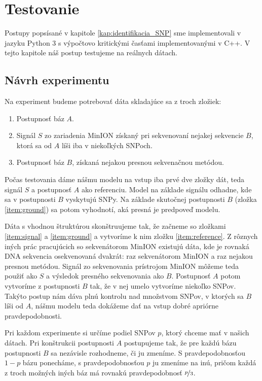 \chapter{Testovanie}

\label{kap:testovanie}

Postupy popsísané v kapitole \ref{kap:identifikacia_SNP} sme implementovali v jazyku Python 3 s
výpočtovo kritickými časťami implementovanými v C++.
V tejto kapitole náš postup testujeme na reálnych dátach.


\section{Návrh experimentu}

Na experiment budeme potrebovať dáta skladajúce sa z troch zložiek:

\begin{enumerate}
\item \label{item:reference} Postupnosť báz $A$.
\item \label{item:signal} Signál $S$ zo zariadenia MinION získaný pri sekvenovaní nejakej sekvencie $B$, 
ktorá sa od $A$ líši iba v niekoľkých SNPoch.
\item \label{item:ground} Postupnosť báz $B$, získaná nejakou presnou sekvenačnou metódou.
\end{enumerate}

Počas testovania dáme nášmu modelu na vstup iba prvé dve zložky dát, teda signál $S$ a postupnosť $A$ 
ako referenciu. Model na základe signálu odhadne, kde sa v postupnosti $B$ vyskytujú SNPy. Na základe
skutočnej postupnosti $B$ (zložka \ref{item:ground}) sa potom vyhodnotí, aká presná je predpoveď modelu.

Dáta s vhodnou štruktúrou skonštruujeme tak, že začneme so zložkami \ref{item:signal} a 
\ref{item:ground} a vytvoríme k nim zložku \ref{item:reference}. Z rôznych iných prác pracujúcich
so sekvenátorom MinION existujú dáta, kde je rovnaká DNA sekvencia osekvenovaná dvakrát: raz sekvenátorom MinION a raz nejakou 
presnou metódou. Signál zo sekvenovania prístrojom MinION môžeme teda použiť ako $S$ a výsledok presného 
sekvenovania ako $B$. Postupnosť $A$ potom vytvoríme z postupnosti $B$ tak, že v nej umelo vytvoríme
niekoľko SNPov. Takýto postup nám dáva plnú kontrolu nad množstvom SNPov, v ktorých sa $B$ líši od $A$,
nášmu modelu teda dokážeme dať na vstup dobré apriórne pravdepodobnosti.

Pri každom experimente si určíme podiel SNPov $p$, ktorý chceme mať v našich dátach. Pri konštrukcii
postupnosti $A$ postupujeme tak, že pre každú bázu postupnosti $B$ sa nezávisle rozhodneme, či ju
zmeníme. S pravdepodobnosťou $1-p$ bázu ponecháme, s pravdepodobnosťou $p$ ju zmeníme na inú, pričom
každá z troch možných iných báz má rovnakú pravdepodobnosť $\nicefrac{p}{3}$.


